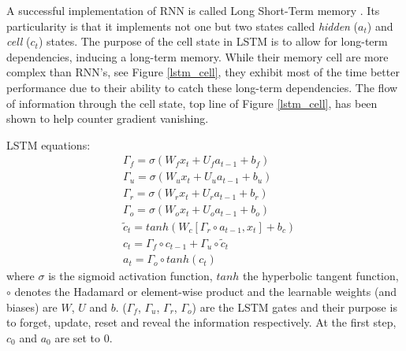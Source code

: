 \documentclass[12pt, a4paper]{report}
\begin{document}
		\par
		A successful implementation of RNN is called Long Short-Term memory \cite{Hochreiter1997lstm}.
		Its particularity is that it implements not one but two states called {\itshape hidden} ($a_{t}$) and {\itshape cell} ($c_{t}$) states.
		The purpose of the cell state in LSTM is to allow for long-term dependencies, inducing a long-term memory.
		While their memory cell are more complex than RNN's, see Figure \ref{lstm_cell}, they exhibit most of the time better performance due to their ability to catch these long-term dependencies.
		The flow of information through the cell state, top line of Figure \ref{lstm_cell}, has been shown to help counter gradient vanishing.
		\par
		LSTM equations:
		\begin{align*}
			& \Gamma_{f} = \sigma(W_{f}x_{t} + U_{f}a_{t-1} + b_{f}) \\
			& \Gamma_{u} = \sigma(W_{u}x_{t} + U_{u}a_{t-1} + b_{u}) \\
			& \Gamma_{r} = \sigma(W_{r}x_{t} + U_{r}a_{t-1} + b_{r}) \\
			& \Gamma_{o} = \sigma(W_{o}x_{t} + U_{o}a_{t-1} + b_{o}) \\
			& \tilde{c}_{t} = tanh(W_{c}[\Gamma_{r} \circ a_{t-1},x_{t}] + b_{c}) \\
			& c_{t} = \Gamma_{f} \circ c_{t-1} + \Gamma_{u} \circ \tilde{c}_{t} \\
			& a_{t} = \Gamma_{o} \circ tanh(c_{t})
		\end{align*}
		where $\sigma$ is the sigmoid activation function, $tanh$ the hyperbolic tangent function, $\circ$ denotes the Hadamard or element-wise product and the learnable weights (and biases) are $W$, $U$ and $b$.
		($\Gamma_{f}$, $\Gamma_{u}$, $\Gamma_{r}$, $\Gamma_{o}$) are the LSTM gates and their purpose is to forget, update, reset and reveal the information respectively.
		At the first step, $c_{0}$ and $a_{0}$ are set to 0.
\end{document}
